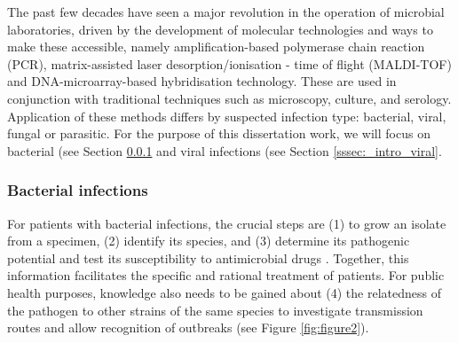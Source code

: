 The past few decades have seen a major revolution in the operation of microbial laboratories, driven by the development of molecular technologies and ways to make these accessible, namely amplification-based polymerase chain reaction (PCR), matrix-assisted laser desorption/ionisation - time of flight (MALDI-TOF) and DNA-microarray-based hybridisation technology. 
These are used in conjunction with traditional techniques such as microscopy, culture, and serology.
Application of these methods differs by suspected infection type: bacterial, viral, fungal or parasitic. 
For the purpose of this dissertation work, we will focus on bacterial (see Section \ref{sssec:_intro_bacterial} and viral infections (see Section \ref{sssec:_intro_viral}.

\subsubsection{Bacterial infections} \label{sssec:_intro_bacterial}

For patients with bacterial infections, the crucial steps are (1) to grow an isolate from a specimen, (2) identify its species, and (3) determine its pathogenic potential and test its susceptibility to antimicrobial drugs  \citep{didelot_transforming_2012}. 
Together, this information facilitates the specific and rational treatment of patients. 
For public health purposes, knowledge also needs to be gained about (4) the relatedness of the pathogen to other strains of the same species to investigate transmission routes and allow recognition of outbreaks \citep{foxman_choosing_2005} (see Figure \ref{fig:figure2}). 

